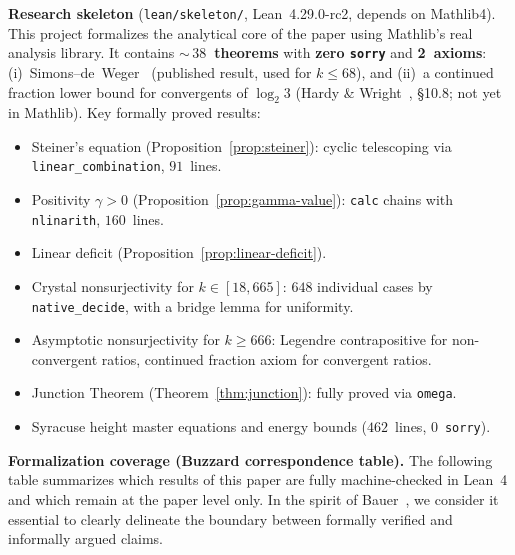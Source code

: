 \documentclass[12pt, a4paper]{amsart}
\theoremstyle{plain}
\theoremstyle{definition}
\theoremstyle{remark}
\begin{document}
\medskip\noindent
\textbf{Research skeleton}
(\texttt{lean/skeleton/}, Lean~4.29.0-rc2, depends on Mathlib4).
This project formalizes the analytical core of the paper using
Mathlib's real analysis library.
It contains \textbf{${\sim}\,38$~theorems} with
\textbf{zero \texttt{sorry}}
and \textbf{2~axioms}:
(i)~Simons--de~Weger~\cite{SimonsDeWeger2005} (published result,
used for $k \leq 68$), and
(ii)~a continued fraction lower bound for convergents of
$\log_2 3$ (Hardy \& Wright~\cite{HardyWright2008},
\S10.8; not yet in Mathlib).
Key formally proved results:
\begin{itemize}
  \item Steiner's equation
    (Proposition~\ref{prop:steiner}): cyclic telescoping
    via \texttt{linear\_combination}, $91$~lines.
  \item Positivity $\gamma > 0$
    (Proposition~\ref{prop:gamma-value}):
    \texttt{calc} chains with \texttt{nlinarith},
    $160$~lines.
  \item Linear deficit
    (Proposition~\ref{prop:linear-deficit}).
  \item Crystal nonsurjectivity for $k \in [18, 665]$:
    $648$ individual cases by \texttt{native\_decide},
    with a bridge lemma for uniformity.
  \item Asymptotic nonsurjectivity for $k \geq 666$:
    Legendre contrapositive for non-convergent ratios,
    continued fraction axiom for convergent ratios.
  \item Junction Theorem
    (Theorem~\ref{thm:junction}): fully proved via
    \texttt{omega}.
  \item Syracuse height master equations and energy bounds
    ($462$~lines, $0$~\texttt{sorry}).
\end{itemize}

\medskip\noindent
\textbf{Formalization coverage
(Buzzard correspondence table).}
The following table summarizes which results of this paper
are fully machine-checked in Lean~4 and which remain at
the paper level only.
In the spirit of Bauer~\cite{Bauer2013},
we consider it essential to clearly delineate the boundary
between formally verified and informally argued claims.
\end{document}
